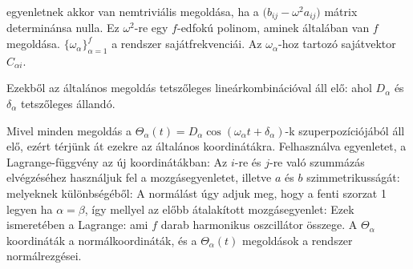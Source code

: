     egyenletnek akkor van nemtriviális megoldása, ha a $\big(b_{ij}- \omega^2 a_{ij}\big)$ mátrix determinánsa nulla.
   Ez $\omega^2$-re egy $f$-edfokú polinom, aminek általában van $f$ megoldása. $\{\omega_\alpha\}_{\alpha=1}^f$ a rendszer sajátfrekvenciái.
   Az $\omega_\alpha$-hoz tartozó sajátvektor $C_{\alpha i}$. 
   
   Ezekből az általános megoldás tetszőleges lineárkombinációval áll elő:
   ahol $D_\alpha$ és $\delta_\alpha$ tetszőleges állandó.
   
   Mivel minden megoldás a $\Theta_\alpha(t)=D_\alpha \cos(\omega_\alpha t+\delta_\alpha)$-k szuperpozíciójából áll elő, ezért térjünk át ezekre az általános koordinátákra.
   Felhasználva  egyenletet, a Lagrange-függvény az új koordinátákban:
   Az $i$-re és $j$-re való szummázás elvégzéséhez használjuk fel a mozgásegyenletet, illetve $a$ és $b$ szimmetrikusságát:
   melyeknek különbségéből:
   A normálást úgy adjuk meg, hogy a fenti szorzat 1 legyen ha $\alpha=\beta$, így
   mellyel az előbb átalakított mozgásegyenlet:
   Ezek ismeretében a Lagrange:
   ami $f$ darab harmonikus oszcillátor összege.
   A $\Theta_\alpha$ koordináták a normálkoordináták, és a $\Theta_\alpha(t)$ megoldások a rendszer normálrezgései.
   
